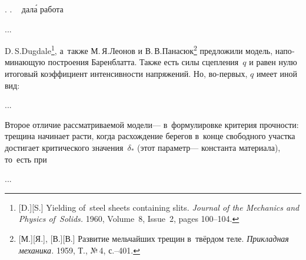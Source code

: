 


   .
       .
~ \foreignlanguage{russian}{дал\'{а} работа}


...




\begin{otherlanguage}{russian}

D.\,S.\;Dugdale\footnote{[D.][S.] Yielding of~steel sheets containing slits. \emph{Journal of the Mechanics and Physics of~Solids.} 1960, Volume~8, Issue~2, pages 100\hbox{--}104.
}\hspace{-0.4ex}, а~также М.\,Я.\;Леонов и В.\,В.\;Панасюк\footnote{[М.][Я.], [В.][В.] Развитие мельчайших трещин в~твёрдом теле. \emph{Прикладная механика.} 1959, Т., №\,4, с.\hbox{--}401.} предложили модель, напоминающую построения Баренблатта.
Также есть силы сцепления~$q$ и равен нулю итоговый коэффициент интенсивности напряжений.
Но, во\hbox{-}первых, $q$ имеет иной вид:

...

Второе отличие рассматриваемой модели\:--- в~формулировке критерия прочности: трещина начинает расти, когда расхождение берегов в~конце свободного участка достигает критического значения~$\delta_{*}$ (этот параметр\:--- константа материала), то~есть при

...



\end{otherlanguage}

